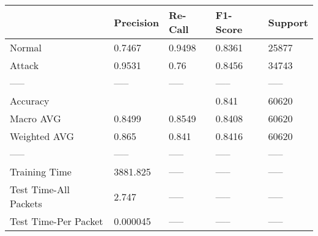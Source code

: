 \begin{tabular}{lllll}
\toprule
{} & Precision & Re-Call & F1-Score & Support \\
\midrule
Normal                &    0.7467 &  0.9498 &   0.8361 &   25877 \\
Attack                &    0.9531 &    0.76 &   0.8456 &   34743 \\
-----                 &     ----- &   ----- &    ----- &   ----- \\
Accuracy              &           &         &    0.841 &   60620 \\
Macro AVG             &    0.8499 &  0.8549 &   0.8408 &   60620 \\
Weighted AVG          &     0.865 &   0.841 &   0.8416 &   60620 \\
-----                 &     ----- &   ----- &    ----- &   ----- \\
Training Time         &  3881.825 &   ----- &    ----- &   ----- \\
Test Time-All Packets &     2.747 &   ----- &    ----- &   ----- \\
Test Time-Per Packet  &  0.000045 &   ----- &    ----- &   ----- \\
\bottomrule
\end{tabular}
